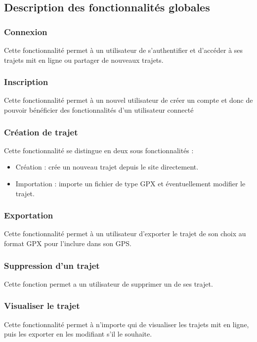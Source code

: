 \documentclass[a4paper]{article}
\begin{document}
\subsection{Description des fonctionnalités globales}
\subsubsection{Connexion}
Cette fonctionnalité permet à un utilisateur de s'authentifier et d'accéder à ses trajets mit en ligne ou partager de nouveaux trajets.

\subsubsection{Inscription}
Cette fonctionnalité permet à un nouvel utilisateur de créer un compte et donc de pouvoir bénéficier des fonctionnalités d'un utilisateur connecté

\subsubsection{Création de trajet}
Cette fonctionnalité se distingue en deux sous fonctionnalités : 
\begin{itemize}
    \item Création : crée un nouveau trajet depuis le site directement.
    \item Importation : importe un fichier de type GPX et éventuellement modifier le trajet.
\end{itemize}

\subsubsection{Exportation}
Cette fonctionnalité permet à un utilisateur d'exporter le trajet de son choix au format GPX pour l'inclure dans son GPS.

\subsubsection{Suppression d'un trajet}
Cette fonction permet a un utilisateur de supprimer un de ses trajet.

\subsubsection{Visualiser le trajet}
Cette fonctionnalité permet à n'importe qui de visualiser les trajets mit en ligne, puis les exporter en les modifiant s'il le souhaite.
\end{document}
